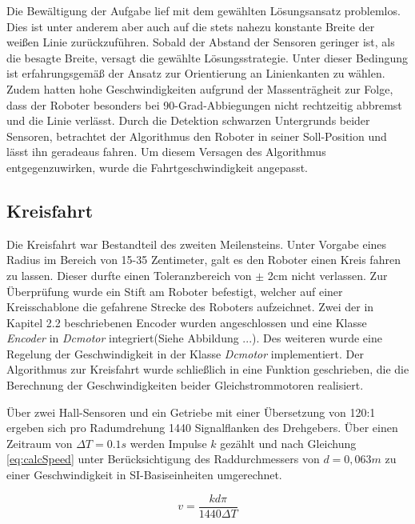 \documentclass[12pt,a4paper,oneside]{article}
\begin{document}
\begin{spacing}{1.15}
Die Bewältigung der Aufgabe lief mit dem gewählten Lösungsansatz problemlos. Dies ist unter anderem aber auch auf die stets nahezu konstante Breite der weißen Linie zurückzuführen. Sobald der Abstand der Sensoren geringer ist, als die besagte Breite, versagt die gewählte Lösungsstrategie. Unter dieser Bedingung ist erfahrungsgemäß der Ansatz zur Orientierung an Linienkanten zu wählen. \\
Zudem hatten hohe Geschwindigkeiten aufgrund der Massenträgheit zur Folge, dass der Roboter besonders bei 90-Grad-Abbiegungen nicht rechtzeitig abbremst und die Linie verlässt. Durch die Detektion schwarzen Untergrunds beider Sensoren, betrachtet der Algorithmus den Roboter in seiner Soll-Position und lässt ihn geradeaus fahren. Um diesem Versagen des Algorithmus entgegenzuwirken, wurde die Fahrtgeschwindigkeit angepasst.

	
\subsection{Kreisfahrt}

Die Kreisfahrt war Bestandteil des zweiten Meilensteins. Unter Vorgabe eines Radius im Bereich von 15-35 Zentimeter, galt es den Roboter einen Kreis fahren zu lassen. Dieser durfte einen Toleranzbereich von $\pm$ 2cm nicht verlassen. Zur Überprüfung wurde ein Stift am Roboter befestigt, welcher auf einer Kreisschablone die gefahrene Strecke des Roboters aufzeichnet. Zwei der in Kapitel 2.2 beschriebenen Encoder wurden angeschlossen und eine Klasse \textit{Encoder} in \textit{Dcmotor} integriert(Siehe Abbildung ...). Des weiteren wurde eine Regelung der Geschwindigkeit in der Klasse \textit{Dcmotor} implementiert. Der Algorithmus zur Kreisfahrt wurde schließlich in eine Funktion geschrieben, die die Berechnung der Geschwindigkeiten beider Gleichstrommotoren realisiert. 

Über zwei Hall-Sensoren und ein Getriebe mit einer Übersetzung von 120:1 \cite{Dem13} ergeben sich pro Radumdrehung 1440 Signalflanken des Drehgebers. Über einen Zeitraum von $\Delta T = 0.1s$ werden Impulse $k$ gezählt und nach Gleichung \ref{eq:calcSpeed} unter Berücksichtigung des Raddurchmessers von $d = 0,063m$ zu einer Geschwindigkeit in SI-Basiseinheiten umgerechnet.

\begin{center}
\begin{equation}
v = \frac{k d \pi}{1440\Delta T}
\label{eq:calcSpeed}
\end{equation}
\end{center} 


\end{spacing}
\end{document}
